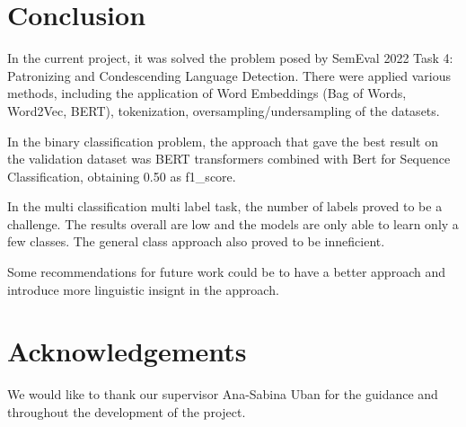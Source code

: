 \documentclass[11pt]{article}
\begin{document}
\begin{enumerate}
\begin{enumerate}
	      \end{enumerate}
\end{enumerate}


\section{Conclusion}

In the current project, it was solved the problem posed by SemEval 2022 Task
4: Patronizing and Condescending Language Detection. There were applied
various methods, including the application of Word Embeddings (Bag of Words,
Word2Vec, BERT), tokenization, oversampling/undersampling of the datasets.

In the binary classification problem, the approach that gave the best result
on the validation dataset was BERT transformers combined with Bert for
Sequence Classification, obtaining 0.50 as f1\_score.

In the multi classification multi label task, the number of labels proved to
be a challenge. The results overall are low and the models are only able to learn
only a few classes. The general class approach also proved to be inneficient.

Some recommendations for future work could be to have a better approach and introduce
more linguistic insignt in the approach.

\section*{Acknowledgements}

We would like to thank our supervisor Ana-Sabina Uban for the guidance and throughout
the development of the project.




\end{document}
